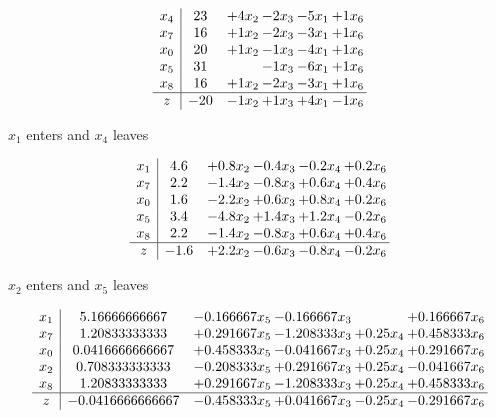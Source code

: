 \documentclass[12pt]{article}
\begin{document}
 \[\begin{array}{c| c c@{\hskip 2pt} c@{\hskip 2pt} c@{\hskip 2pt} c@{\hskip 2pt} }
 x_{4}   &  23 & + 4 x_{2} & -2 x_{3} & -5 x_{1} & + 1 x_{6}\\
 x_{7}   &  16 & + 1 x_{2} & -2 x_{3} & -3 x_{1} & + 1 x_{6}\\
 x_{0}   &  20 & + 1 x_{2} & -1 x_{3} & -4 x_{1} & + 1 x_{6}\\
 x_{5}   &  31  &   & -1 x_{3} & -6 x_{1} & + 1 x_{6}\\
 x_{8}   &  16 & + 1 x_{2} & -2 x_{3} & -3 x_{1} & + 1 x_{6}\\
\hline
z    &  -20 & -1 x_{2} & + 1 x_{3} & + 4 x_{1} & -1 x_{6}\\
\end{array}\]


 $ x_{1} $ enters and $ x_{4} $ leaves 

 \[\begin{array}{c| c c@{\hskip 2pt} c@{\hskip 2pt} c@{\hskip 2pt} c@{\hskip 2pt} }
 x_{1}   &  4.6 & + 0.8 x_{2} & -0.4 x_{3} & -0.2 x_{4} & + 0.2 x_{6}\\
 x_{7}   &  2.2 & -1.4 x_{2} & -0.8 x_{3} & + 0.6 x_{4} & + 0.4 x_{6}\\
 x_{0}   &  1.6 & -2.2 x_{2} & + 0.6 x_{3} & + 0.8 x_{4} & + 0.2 x_{6}\\
 x_{5}   &  3.4 & -4.8 x_{2} & + 1.4 x_{3} & + 1.2 x_{4} & -0.2 x_{6}\\
 x_{8}   &  2.2 & -1.4 x_{2} & -0.8 x_{3} & + 0.6 x_{4} & + 0.4 x_{6}\\
\hline
z    &  -1.6 & + 2.2 x_{2} & -0.6 x_{3} & -0.8 x_{4} & -0.2 x_{6}\\
\end{array}\]


 $ x_{2} $ enters and $ x_{5} $ leaves 

 \[\begin{array}{c| c c@{\hskip 2pt} c@{\hskip 2pt} c@{\hskip 2pt} c@{\hskip 2pt} }
 x_{1}   &  5.16666666667 & -0.166667 x_{5} & -0.166667 x_{3} &   & + 0.166667 x_{6}\\
 x_{7}   &  1.20833333333 & + 0.291667 x_{5} & -1.208333 x_{3} & + 0.25 x_{4} & + 0.458333 x_{6}\\
 x_{0}   &  0.0416666666667 & + 0.458333 x_{5} & -0.041667 x_{3} & + 0.25 x_{4} & + 0.291667 x_{6}\\
 x_{2}   &  0.708333333333 & -0.208333 x_{5} & + 0.291667 x_{3} & + 0.25 x_{4} & -0.041667 x_{6}\\
 x_{8}   &  1.20833333333 & + 0.291667 x_{5} & -1.208333 x_{3} & + 0.25 x_{4} & + 0.458333 x_{6}\\
\hline
z    &  -0.0416666666667 & -0.458333 x_{5} & + 0.041667 x_{3} & -0.25 x_{4} & -0.291667 x_{6}\\
\end{array}\]
\end{document}
